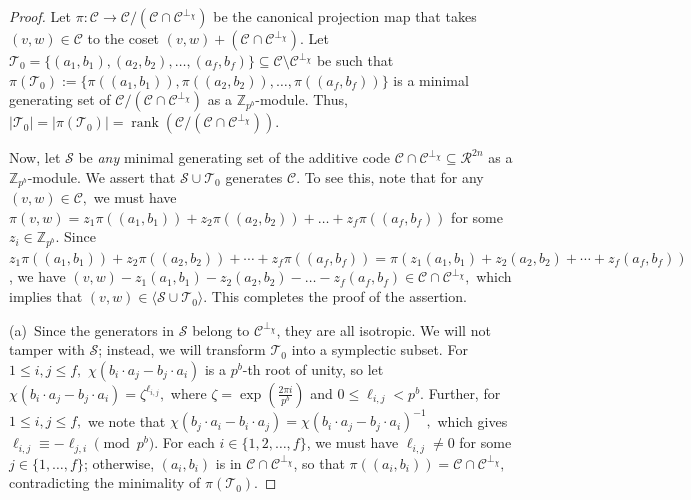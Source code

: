 \documentclass{article}
\DeclareMathOperator{\rank}{rank}
\theoremstyle{remark}
\theoremstyle{definition}
\numberwithin{equation}{section}
\begin{document}
\begin{proof} 
Let $\pi : \mathcal{C}  \to \mathcal{C}/(\mathcal{C} \cap \mathcal{C}^{\perp_\chi})$ be the canonical projection map that takes $(v,w) \in \mathcal{C}$ to the coset $(v,w) + (\mathcal{C} \cap \mathcal{C}^{\perp_\chi})$. Let $\mathcal{T}_0=\{(a_1,b_1),(a_2,b_2),\ldots,(a_f,b_f)\} \subseteq \mathcal{C} \setminus \mathcal{C}^{\perp_\chi}$ be such that $\pi(\mathcal{T}_0) := \{\pi((a_1,b_1)),\pi((a_2,b_2)),\ldots,\pi((a_f,b_f))\}$ is a minimal generating set of $\mathcal{C}/(\mathcal{C} \cap \mathcal{C}^{\perp_\chi})$ as a $\mathbb{Z}_{p^b}$-module. Thus, $|\mathcal{T}_0| = |\pi(\mathcal{T}_0)| = \rank(\mathcal{C}/(\mathcal{C} \cap \mathcal{C}^{\perp_\chi}))$.

Now,  let $\mathcal{S}$ be \emph{any} minimal generating set of the additive code $\mathcal{C} \cap \mathcal{C}^{\perp_\chi}  \subseteq \mathcal{R}^{2n}$ as a $\mathbb{Z}_{p^b}$-module. We assert that  $\mathcal{S} \cup \mathcal{T}_0$ generates $\mathcal{C}$.
To see this, note that for any $(v,w) \in \mathcal{C},$ we must have 
$\pi(v,w)=z_1\pi((a_1,b_1))+z_2\pi((a_2,b_2))+\ldots+z_f\pi((a_f,b_f))$ 
for some $z_i \in \mathbb{Z}_{p^b}.$  Since $z_1 \pi((a_1,b_1)) + z_2\pi((a_2,b_2)) + \cdots + z_f \pi((a_f,b_f)) = \pi (z_1 (a_1,b_1) + z_2 (a_2,b_2) + \cdots + z_f (a_f,b_f))$, we have $(v,w)-z_1(a_1,b_1)-z_2(a_2,b_2)-\ldots-z_f(a_f,b_f) \in \mathcal{C} \cap \mathcal{C}^{\perp_\chi},$ which implies that $(v,w) \in \langle \mathcal{S} \cup \mathcal{T}_0 \rangle$. This completes the proof of the assertion.


(a)\ Since the generators in $\mathcal{S}$ belong to $\mathcal{C}^{\perp_\chi}$, they are all isotropic. We will not tamper with $\mathcal{S}$; instead, we will transform $\mathcal{T}_0$ into a symplectic subset. For $1 \leq i,j \leq f,$ $\chi(b_i \cdot a_j-b_j \cdot a_i)$ is a $p^b$-th root of unity, so let $\chi(b_i \cdot a_j-b_j \cdot a_i)=\zeta^{\ell_{i,j}},$ where $\zeta = \exp(\frac{2\pi i}{p^b})$ and $0\leq \ell_{i,j} < p^b.$ Further, for $1 \leq i,j \leq f,$ we note that $\chi(b_j \cdot a_i-b_i \cdot a_j)=\chi(b_i \cdot a_j-b_j \cdot a_i)^{-1},$ which gives $\ell_{i,j} \equiv -\ell_{j,i} \pmod{p^b}$. For each $i \in \{1,2,\ldots,f\}$, we must have $\ell_{i,j} \ne 0$ for some $j \in \{1,\ldots,f\}$; otherwise, $(a_i,b_i)$ is in $\mathcal{C} \cap \mathcal{C}^{\perp_\chi}$, so that $\pi((a_i,b_i))=\mathcal{C} \cap \mathcal{C}^{\perp_\chi},$ contradicting the minimality of $\pi(\mathcal{T}_0)$.


\end{proof}
\end{document}
